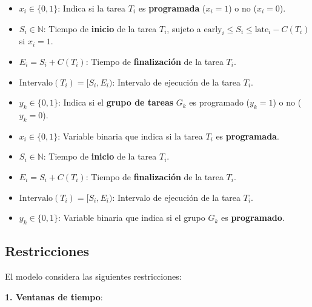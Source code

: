 \documentclass{article}
\begin{document}
\begin{itemize}
    \item \( x_i \in \{0, 1\} \): Indica si la tarea \( T_i \) es \textbf{programada} (\( x_i = 1 \)) o no (\( x_i = 0 \)).
    \item \( S_i \in \mathbb{N} \): Tiempo de \textbf{inicio} de la tarea \( T_i \), sujeto a \( \text{early}_i \leq S_i \leq \text{late}_i - C(T_i) \) si \( x_i = 1 \).
    \item \( E_i = S_i + C(T_i) \): Tiempo de \textbf{finalización} de la tarea \( T_i \).
    \item \( \text{Intervalo}(T_i) = [S_i, E_i) \): Intervalo de ejecución de la tarea \( T_i \).
    \item \( y_k \in \{0, 1\} \): Indica si el \textbf{grupo de tareas} \( G_k \) es programado (\( y_k = 1 \)) o no (\( y_k = 0 \)).
\end{itemize}

\vspace{0.5cm}

\begin{tcolorbox}[colback=gray!5!white, colframe=gray!75!black, title={Variables de decisión}]
    \begin{itemize}
        \item \( x_i \in \{0, 1\} \): Variable binaria que indica si la tarea \( T_i \) es \textbf{programada}.
        \item \( S_i \in \mathbb{N} \): Tiempo de \textbf{inicio} de la tarea \( T_i \).
        \item \( E_i = S_i + C(T_i) \): Tiempo de \textbf{finalización} de la tarea \( T_i \).
        \item \( \text{Intervalo}(T_i) = [S_i, E_i) \): Intervalo de ejecución de la tarea \( T_i \).
        \item \( y_k \in \{0, 1\} \): Variable binaria que indica si el grupo \( G_k \) es \textbf{programado}.
    \end{itemize}
\end{tcolorbox}

\vspace{0.5cm}

\subsection*{Restricciones}

El modelo considera las siguientes restricciones:

\textbf{1. Ventanas de tiempo}:
\end{document}
